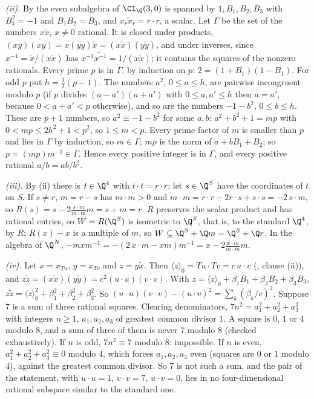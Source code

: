 \emph{(ii).} By  the even subalgebra of $\Cl_{\Q}(3,0)$ is spanned by $1, B_{1}, B_{2}, B_{3}$ with $B_{k}^{2} = -1$ and $B_{1}B_{2} = B_{3}$, and $x_{r}\tilde{x}_{r} = r \cdot r$, a scalar. Let $\Gamma$ be the set of the numbers $x\tilde{x}$, $x \ne 0$ rational. It is closed under products, $(xy)\widetilde{(xy)} = x(y\tilde{y})\tilde{x} = (x\tilde{x})(y\tilde{y})$, and under inverses, since $x^{-1} = \tilde{x}/(x\tilde{x})$ has $x^{-1}\widetilde{x^{-1}} = 1/(x\tilde{x})$; it contains the squares of the nonzero rationals. Every prime $p$ is in $\Gamma$, by induction on $p$: $2 = (1 + B_{1})(1 - B_{1})$. For odd $p$ put $h = \tfrac12(p - 1)$. The numbers $a^{2}$, $0 \le a \le h$, are pairwise incongruent modulo $p$ (if $p$ divides $(a - a')(a + a')$ with $0 \le a, a' \le h$ then $a = a'$, because $0 < a + a' < p$ otherwise), and so are the numbers $-1 - b^{2}$, $0 \le b \le h$. These are $p + 1$ numbers, so $a^{2} \equiv -1 - b^{2}$ for some $a, b$: $a^{2} + b^{2} + 1 = mp$ with $0 < mp \le 2h^{2} + 1 < p^{2}$, so $1 \le m < p$. Every prime factor of $m$ is smaller than $p$ and lies in $\Gamma$ by induction, so $m \in \Gamma$; $mp$ is the norm of $a + bB_{1} + B_{2}$; so $p = (mp)m^{-1} \in \Gamma$. Hence every positive integer is in $\Gamma$, and every positive rational $a/b = ab/b^{2}$.

\emph{(iii).} By (ii) there is $t \in \Q^{4}$ with $t \cdot t = r \cdot r$; let $s \in \Q^{S}$ have the coordinates of $t$ on $S$. If $s \ne r$, $m = r - s$ has $m \cdot m > 0$ and $m \cdot m = r \cdot r - 2r \cdot s + s \cdot s = -2\,s \cdot m$, so $R(s) = s - 2\frac{s \cdot m}{m \cdot m}m = s + m = r$. $R$ preserves the scalar product and has rational entries, so $W = R(\Q^{S})$ is isometric to $\Q^{S}$, that is, to the standard $\Q^{4}$, by $R$; $R(x) - x$ is a multiple of $m$, so $W \subseteq \Q^{S} + \Q m = \Q^{S} + \Q r$. In the algebra of $\Q^{N}$, $-mxm^{-1} = -(2\,x \cdot m - xm)m^{-1} = x - 2\frac{x \cdot m}{m \cdot m}m$.

\emph{(iv).} Let $x = x_{Tu}$, $y = x_{Tv}$ and $z = y\tilde{x}$. Then $\langle z\rangle_{0} = Tu \cdot Tv = c\,u \cdot v$ (, clause (ii)), and $z\tilde{z} = (x\tilde{x})(y\tilde{y}) = c^{2}(u \cdot u)(v \cdot v)$. With $z = \langle z\rangle_{0} + \beta_{1}B_{1} + \beta_{2}B_{2} + \beta_{3}B_{3}$, $z\tilde{z} = \langle z\rangle_{0}^{2} + \beta_{1}^{2} + \beta_{2}^{2} + \beta_{3}^{2}$. So $(u \cdot u)(v \cdot v) - (u \cdot v)^{2} = \sum_{k}(\beta_{k}/c)^{2}$. Suppose $7$ is a sum of three rational squares. Clearing denominators, $7n^{2} = a_{1}^{2} + a_{2}^{2} + a_{3}^{2}$ with integers $n \ge 1$, $a_{1}, a_{2}, a_{3}$ of greatest common divisor $1$. A square is $0$, $1$ or $4$ modulo $8$, and a sum of three of them is never $7$ modulo $8$ (checked exhaustively). If $n$ is odd, $7n^{2} \equiv 7$ modulo $8$: impossible. If $n$ is even, $a_{1}^{2} + a_{2}^{2} + a_{3}^{2} \equiv 0$ modulo $4$, which forces $a_{1}, a_{2}, a_{3}$ even (squares are $0$ or $1$ modulo $4$), against the greatest common divisor. So $7$ is not such a sum, and the pair of the statement, with $u \cdot u = 1$, $v \cdot v = 7$, $u \cdot v = 0$, lies in no four-dimensional rational subspace similar to the standard one.

